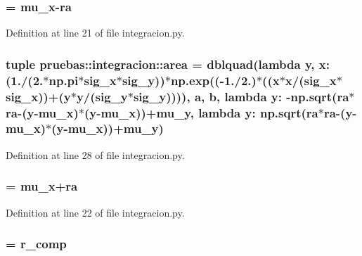 \subsubsection[{a}]{ = {\bf mu\-\_\-x}-\/{\bf ra}}\label{namespacepruebas_1_1integracion_a22680fd05f3edddfe252426b176be670}


\-Definition at line 21 of file integracion.\-py.

\subsubsection[{area}]{\setlength{\rightskip}{0pt plus 5cm}tuple {\bf pruebas\-::integracion\-::area} = dblquad(lambda y, x\-: (1./(2.$\ast$np.\-pi$\ast${\bf sig\-\_\-x}$\ast${\bf sig\-\_\-y}))$\ast$np.\-exp((-\/1./2.)$\ast$((x$\ast$x/({\bf sig\-\_\-x}$\ast${\bf sig\-\_\-x}))+(y$\ast$y/({\bf sig\-\_\-y}$\ast${\bf sig\-\_\-y})))), {\bf a}, {\bf b}, lambda y\-: -\/np.\-sqrt({\bf ra}$\ast${\bf ra}-\/(y-\/{\bf mu\-\_\-x})$\ast$(y-\/{\bf mu\-\_\-x}))+{\bf mu\-\_\-y}, lambda y\-: np.\-sqrt({\bf ra}$\ast${\bf ra}-\/(y-\/{\bf mu\-\_\-x})$\ast$(y-\/{\bf mu\-\_\-x}))+{\bf mu\-\_\-y})}\label{namespacepruebas_1_1integracion_a814ab7adb726e9505a5a855c8c6f6c4c}


\-Definition at line 28 of file integracion.\-py.

\subsubsection[{b}]{ = {\bf mu\-\_\-x}+{\bf ra}}\label{namespacepruebas_1_1integracion_a9623688f3053aae5088a4f221c13aa43}


\-Definition at line 22 of file integracion.\-py.

\subsubsection[{mu\-\_\-x}]{ = {\bf r\-\_\-comp}}\label{namespacepruebas_1_1integracion_a201744c2ba64dccfa900c34bd93e6ee6}


